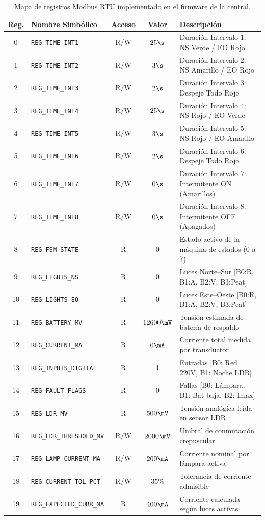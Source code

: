 \begin{table}[!ht]
  \centering
  \small
  \renewcommand{\arraystretch}{1.18}
  \caption{Mapa de registros Modbus RTU implementado en el firmware de la central.}
  \label{tab:mapa_modbus}
  \begin{tabular}{c l c c p{6.5cm}}
    \toprule
    \textbf{Reg.} & \textbf{Nombre Simbólico} & \textbf{Acceso} & \textbf{Valor} & \textbf{Descripción} \\
    \midrule
    0 & \texttt{REG\_TIME\_INT1} & R/W & $25\s$ & Duración Intervalo 1: NS Verde / EO Rojo \\
    1 & \texttt{REG\_TIME\_INT2} & R/W & $3\s$  & Duración Intervalo 2: NS Amarillo / EO Rojo \\
    2 & \texttt{REG\_TIME\_INT3} & R/W & $2\s$  & Duración Intervalo 3: Despeje Todo Rojo \\
    3 & \texttt{REG\_TIME\_INT4} & R/W & $25\s$ & Duración Intervalo 4: NS Rojo / EO Verde \\
    4 & \texttt{REG\_TIME\_INT5} & R/W & $3\s$  & Duración Intervalo 5: NS Rojo / EO Amarillo \\
    5 & \texttt{REG\_TIME\_INT6} & R/W & $2\s$  & Duración Intervalo 6: Despeje Todo Rojo \\
    6 & \texttt{REG\_TIME\_INT7} & R/W & $0\s$  & Duración Intervalo 7: Intermitente ON (Amarillos) \\
    7 & \texttt{REG\_TIME\_INT8} & R/W & $0\s$  & Duración Intervalo 8: Intermitente OFF (Apagados) \\
    8 & \texttt{REG\_FSM\_STATE} & R   & 0      & Estado activo de la máquina de estados (0 a 7) \\
    9 & \texttt{REG\_LIGHTS\_NS} & R   & 0      & Luces Norte--Sur [B0:R, B1:A, B2:V, B3:Peat] \\
    10 & \texttt{REG\_LIGHTS\_EO} & R  & 0      & Luces Este--Oeste [B0:R, B1:A, B2:V, B3:Peat] \\
    11 & \texttt{REG\_BATTERY\_MV} & R & $12600\mV$ & Tensión estimada de batería de respaldo \\
    12 & \texttt{REG\_CURRENT\_MA} & R & $0\mA$     & Corriente total medida por transductor \\
    13 & \texttt{REG\_INPUTS\_DIGITAL} & R & 1   & Entradas [B0: Red 220V, B1: Noche LDR] \\
    14 & \texttt{REG\_FAULT\_FLAGS} & R    & 0   & Fallas [B0: Lámpara, B1: Bat baja, B2: Imax] \\
    15 & \texttt{REG\_LDR\_MV} & R         & $500\mV$ & Tensión analógica leída en sensor LDR \\
    16 & \texttt{REG\_LDR\_THRESHOLD\_MV} & R/W & $2000\mV$ & Umbral de conmutación crepuscular \\
    17 & \texttt{REG\_LAMP\_CURRENT\_MA} & R/W & $200\mA$ & Corriente nominal por lámpara activa \\
    18 & \texttt{REG\_CURRENT\_TOL\_PCT} & R/W & $35\%$   & Tolerancia de corriente admisible \\
    19 & \texttt{REG\_EXPECTED\_CURR\_MA} & R  & $400\mA$ & Corriente calculada según luces activas \\
    \bottomrule
  \end{tabular}
\end{table}
